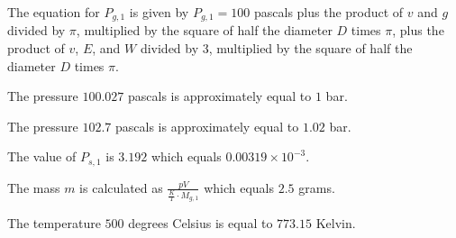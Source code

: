The equation for \( P_{g,1} \) is given by \( P_{g,1} = 100 \) pascals plus the product of \( v \) and \( g \) divided by \( \pi \), multiplied by the square of half the diameter \( D \) times \( \pi \), plus the product of \( v \), \( E \), and \( W \) divided by 3, multiplied by the square of half the diameter \( D \) times \( \pi \).

The pressure \( 100.027 \) pascals is approximately equal to \( 1 \) bar.

The pressure \( 102.7 \) pascals is approximately equal to \( 1.02 \) bar.

The value of \( P_{s,1} \) is \( 3.192 \) which equals \( 0.00319 \times 10^{-3} \).

The mass \( m \) is calculated as \( \frac{pV}{\frac{K}{T} \cdot M_{g,1}} \) which equals \( 2.5 \) grams.

The temperature \( 500 \) degrees Celsius is equal to \( 773.15 \) Kelvin.